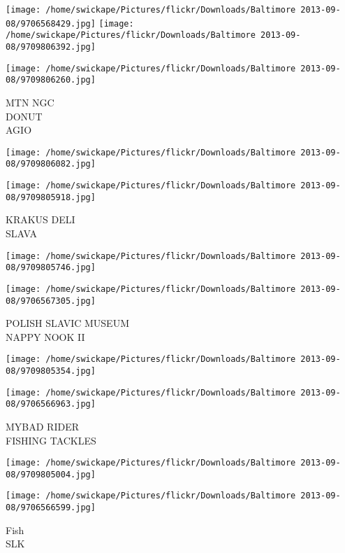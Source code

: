 \documentclass[10pt,letterpaper]{article}
\begin{document}
\texttt{[image: /home/swickape/Pictures/flickr/Downloads/Baltimore 2013-09-08/9706568429.jpg]}
\texttt{[image: /home/swickape/Pictures/flickr/Downloads/Baltimore 2013-09-08/9709806392.jpg]}

\texttt{[image: /home/swickape/Pictures/flickr/Downloads/Baltimore 2013-09-08/9709806260.jpg]}

MTN NGC\\
DONUT\\
AGIO\\
\pagebreak

\texttt{[image: /home/swickape/Pictures/flickr/Downloads/Baltimore 2013-09-08/9709806082.jpg]}

\vspace{0.25in}
\texttt{[image: /home/swickape/Pictures/flickr/Downloads/Baltimore 2013-09-08/9709805918.jpg]}

KRAKUS DELI\\
SLAVA\\
\pagebreak

\texttt{[image: /home/swickape/Pictures/flickr/Downloads/Baltimore 2013-09-08/9709805746.jpg]}

\vspace{0.25in}
\texttt{[image: /home/swickape/Pictures/flickr/Downloads/Baltimore 2013-09-08/9706567305.jpg]}

POLISH SLAVIC MUSEUM\\
NAPPY NOOK II\\
\pagebreak

\texttt{[image: /home/swickape/Pictures/flickr/Downloads/Baltimore 2013-09-08/9709805354.jpg]}

\vspace{0.25in}
\texttt{[image: /home/swickape/Pictures/flickr/Downloads/Baltimore 2013-09-08/9706566963.jpg]}

MYBAD RIDER\\
FISHING TACKLES\\
\pagebreak

\texttt{[image: /home/swickape/Pictures/flickr/Downloads/Baltimore 2013-09-08/9709805004.jpg]}

\vspace{0.25in}
\texttt{[image: /home/swickape/Pictures/flickr/Downloads/Baltimore 2013-09-08/9706566599.jpg]}

Fish\\
SLK\\
\pagebreak
\end{document}
